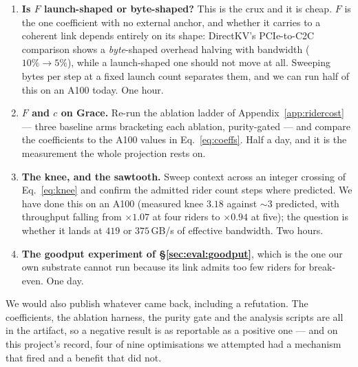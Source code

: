 \begin{enumerate}\itemsep2pt
\item \textbf{Is $F$ launch-shaped or byte-shaped?} This is the crux and it is
  cheap. $F$ is the one coefficient with no external anchor, and whether it carries
  to a coherent link depends entirely on its shape: DirectKV's PCIe-to-C2C
  comparison shows a \emph{byte}-shaped overhead halving with bandwidth
  ($10\% \to 5\%$), while a launch-shaped one should not move at all. Sweeping
  bytes per step at a fixed launch count separates them, and we can run half of
  this on an A100 today. One hour.
\item \textbf{$F$ and $c$ on Grace.} Re-run the ablation ladder of
  Appendix~\ref{app:ridercost} --- three baseline arms bracketing each ablation,
  purity-gated --- and compare the coefficients to the A100 values in
  Eq.~\ref{eq:coeffs}. Half a day, and it is the measurement the whole projection
  rests on.
\item \textbf{The knee, and the sawtooth.} Sweep context across an integer crossing
  of Eq.~\ref{eq:knee} and confirm the admitted rider count steps where predicted.
  We have done this on an A100 (measured knee $3.18$ against $\sim 3$ predicted, with
  throughput falling from $\times 1.07$ at four riders to $\times 0.94$ at five);
  the question is whether it lands at $419$ or $375$\,GB/s of effective bandwidth.
  Two hours.
\item \textbf{The goodput experiment of \S\ref{sec:eval:goodput}}, which is the one
  our own substrate cannot run because its link admits too few riders for
  break-even. One day.
\end{enumerate}

We would also publish whatever came back, including a refutation. The coefficients,
the ablation harness, the purity gate and the analysis scripts are all in the
artifact, so a negative result is as reportable as a positive one --- and on this
project's record, four of nine optimisations we attempted had a mechanism that
fired and a benefit that did not.
